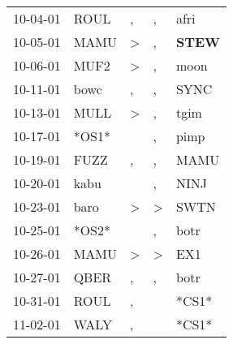 \begin{supertabular}{p{0.07\textwidth}p{0.06\textwidth}p{0.02\textwidth}p{0.02\textwidth}p{0.06\textwidth}}
          10-04-01\textsuperscript{} &           ROUL\textsuperscript{} &                , &                , &           afri\textsuperscript{} \\
          10-05-01\textsuperscript{} &           MAMU\textsuperscript{} &     \textgreater &                , &  \textbf{STEW\textsuperscript{}} \\
          10-06-01\textsuperscript{} &           MUF2\textsuperscript{} &     \textgreater &                , &           moon\textsuperscript{} \\
          10-11-01\textsuperscript{} &           bowc\textsuperscript{} &                , &                , &           SYNC\textsuperscript{} \\
          10-13-01\textsuperscript{} &           MULL\textsuperscript{} &     \textgreater &                , &           tgim\textsuperscript{} \\
          10-17-01\textsuperscript{} &                            *OS1* &                  &                , &           pimp\textsuperscript{} \\
          10-19-01\textsuperscript{} &           FUZZ\textsuperscript{} &                , &                , &           MAMU\textsuperscript{} \\
          10-20-01\textsuperscript{} &           kabu\textsuperscript{} &                  &                , &           NINJ\textsuperscript{} \\
          10-23-01\textsuperscript{} &           baro\textsuperscript{} &     \textgreater &     \textgreater &           SWTN\textsuperscript{} \\
          10-25-01\textsuperscript{} &                            *OS2* &                  &                , &           botr\textsuperscript{} \\
          10-26-01\textsuperscript{} &           MAMU\textsuperscript{} &     \textgreater &     \textgreater &            EX1\textsuperscript{} \\
          10-27-01\textsuperscript{} &           QBER\textsuperscript{} &                , &                , &           botr\textsuperscript{} \\
          10-31-01\textsuperscript{} &           ROUL\textsuperscript{} &                , &                  &                            *CS1* \\
          11-02-01\textsuperscript{} &           WALY\textsuperscript{} &                , &                  &                            *CS1* \\

\end{supertabular}

